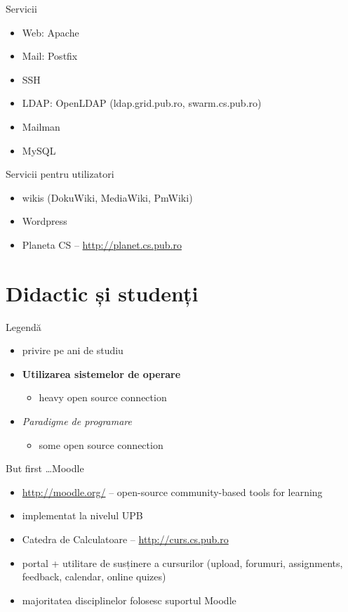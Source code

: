 \documentclass{beamer}
\begin{document}
\begin{frame}{Servicii}
	\begin{itemize}
		\item Web: Apache
		\item Mail: Postfix
		\item SSH
		\item LDAP: OpenLDAP (ldap.grid.pub.ro, swarm.cs.pub.ro)
		\item Mailman
		\item MySQL
	\end{itemize}
\end{frame}

\begin{frame}{Servicii pentru utilizatori}
	\begin{itemize}
		\item wikis (DokuWiki, MediaWiki, PmWiki)
		\item Wordpress
		\item Planeta CS -- \url{http://planet.cs.pub.ro}
	\end{itemize}
\end{frame}

\section{Didactic și studenți}

\frame{\tableofcontents[currentsection]}

\begin{frame}{Legendă}
	\begin{itemize}
		\item privire pe ani de studiu
		\item \textbf{Utilizarea sistemelor de operare}
			\begin{itemize}
				\item heavy open source connection
			\end{itemize}
		\item \textit{Paradigme de programare}
			\begin{itemize}
				\item some open source connection
			\end{itemize}
	\end{itemize}
\end{frame}

\begin{frame}{But first \ldots Moodle}
	\begin{itemize}
		\item \url{http://moodle.org/} -- open-source community-based tools
		for learning
		\item implementat la nivelul UPB
		\item Catedra de Calculatoare -- \url{http://curs.cs.pub.ro}
		\item portal + utilitare de susținere a cursurilor (upload, forumuri,
		assignments, feedback, calendar, online quizes)
		\item majoritatea disciplinelor folosesc suportul Moodle
	\end{itemize}
\end{frame}
\end{document}
